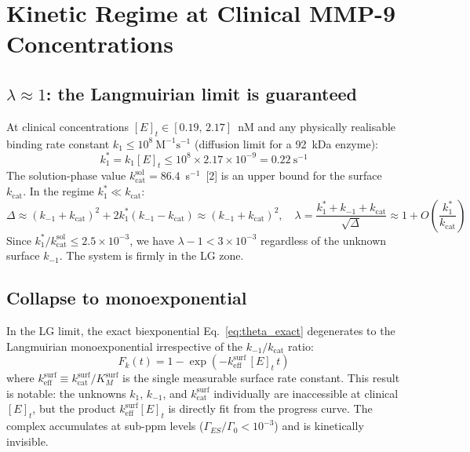 \documentclass[10pt,a4paper]{article}
\numberwithin{equation}{section}
\newcommand{\Mms}{\text{M}^{-1}\text{s}^{-1}}
\newcommand{\cit}[1]{[#1]}
\newcommand{\kcat}{k_{\text{cat}}}
\newcommand{\keff}{k_{\text{eff}}}
\newcommand{\GES}{\Gamma_{ES}}
\newcommand{\Gz}{\Gamma_0}
\begin{document}
\section{Kinetic Regime at Clinical MMP-9 Concentrations}
\label{sec:regime}

\subsection{$\lambda \approx 1$: the Langmuirian limit is guaranteed}

At clinical concentrations $[E]_t \in [0.19,\,2.17]$~nM and any physically
realisable binding rate constant $k_1 \leq 10^8\ \Mms$ (diffusion limit for
a 92~kDa enzyme):
\begin{equation}
  \label{eq:k1star}
  k_1^* = k_1[E]_t \leq 10^8 \times 2.17\times10^{-9} = 0.22\ \text{s}^{-1}
\end{equation}
The solution-phase value $\kcat^{\text{sol}} = 86.4$~s$^{-1}$~\cit{2} is an upper
bound for the surface $\kcat$. In the regime $k_1^* \ll \kcat$:
\begin{equation}
  \label{eq:lambda_approx}
  \Delta \approx (k_{-1}+\kcat)^2 + 2k_1^*(k_{-1}-\kcat) \approx (k_{-1}+\kcat)^2,
  \quad
  \lambda = \frac{k_1^*+k_{-1}+\kcat}{\sqrt{\Delta}} \approx 1 + O\!\left(\frac{k_1^*}{\kcat}\right)
\end{equation}
Since $k_1^*/\kcat^{\text{sol}} \leq 2.5\times10^{-3}$, we have $\lambda - 1 < 3\times10^{-3}$
regardless of the unknown surface $k_{-1}$. The system is firmly in the LG zone.

\subsection{Collapse to monoexponential}

In the LG limit, the exact biexponential Eq.~\eqref{eq:theta_exact} degenerates
to the Langmuirian monoexponential irrespective of the $k_{-1}/\kcat$ ratio:
\begin{equation}
  \label{eq:monoexp}
  \boxed{F_k(t) = 1 - \exp\!\left(-\keff^{\text{surf}}\,[E]_t\,t\right)}
\end{equation}
where $\keff^{\text{surf}} \equiv \kcat^{\text{surf}}/K_M^{\text{surf}}$ is the single
measurable surface rate constant. This result is notable: the unknowns $k_1$, $k_{-1}$,
and $\kcat^{\text{surf}}$ individually are inaccessible at clinical $[E]_t$, but
the product $\keff^{\text{surf}}[E]_t$ is directly fit from the progress curve. The
complex accumulates at sub-ppm levels ($\GES/\Gz < 10^{-3}$) and is kinetically invisible.
\end{document}
